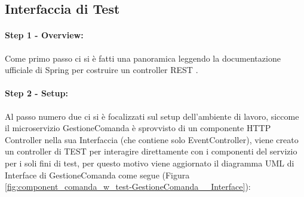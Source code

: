 \subsection{Interfaccia di Test}
\label{subsec:interfaccia-test}
\paragraph{Step 1 - Overview:}
Come primo passo ci si è fatti una panoramica leggendo la documentazione ufficiale di Spring per costruire un controller REST \cite{spring-rest}.
\paragraph{Step 2 - Setup:}
Al passo numero due ci si è focalizzati sul setup dell’ambiente di lavoro, siccome il microservizio GestioneComanda è sprovvisto di un componente HTTP Controller nella sua Interfaccia (che contiene solo EventController), viene creato un controller di TEST per interagire direttamente con i componenti del servizio per i soli fini di test, per questo motivo viene aggiornato il diagramma UML di Interface di GestioneComanda come segue (Figura \vref{fig:component_comanda_w_test-GestioneComanda__Interface}):
